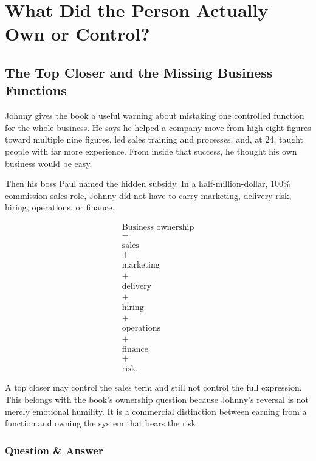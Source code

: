 \documentclass[11pt,oneside]{book}
\begin{document}
\chapter{What Did the Person Actually Own or Control?}

\section{The Top Closer and the Missing Business Functions}

Johnny gives the book a useful warning about mistaking one controlled function for the whole business. He says he helped a company move from high eight figures toward multiple nine figures, led sales training and processes, and, at 24, taught people with far more experience. From inside that success, he thought his own business would be easy.

Then his boss Paul named the hidden subsidy. In a half-million-dollar, \(100\%\) commission sales role, Johnny did not have to carry marketing, delivery risk, hiring, operations, or finance.

\begin{equation}
\begin{gathered}
\text{Business ownership}\\
=\\
\text{sales}\\
+\\
\text{marketing}\\
+\\
\text{delivery}\\
+\\
\text{hiring}\\
+\\
\text{operations}\\
+\\
\text{finance}\\
+\\
\text{risk}.
\end{gathered}
\end{equation}

A top closer may control the sales term and still not control the full expression. This belongs with the book's ownership question because Johnny's reversal is not merely emotional humility. It is a commercial distinction between earning from a function and owning the system that bears the risk.

\subsection{Question \& Answer}
\end{document}

